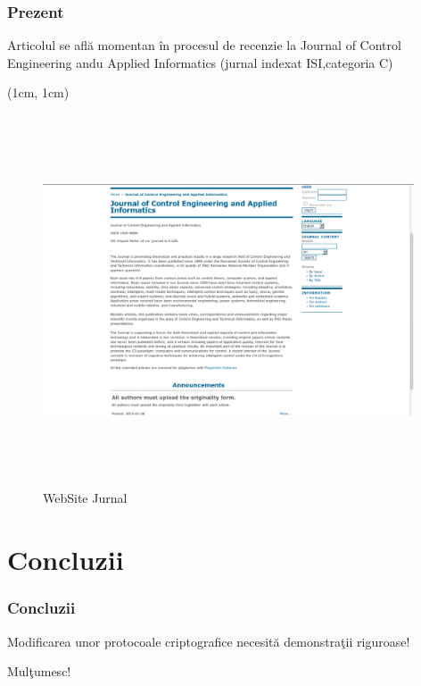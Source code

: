 \documentclass{beamer}
\theoremstyle{definition}
\begin{document}
\begin{frame}
    \frametitle{Prezent}
     {
        Articolul se afl\u{a} momentan \^{i}n procesul de recenzie la Journal of Control Engineering andu Applied Informatics (jurnal indexat ISI,categoria C)
    }
     {
        \begin{center}
         \begin{textblock*}{4cm}(1cm, 1cm)
            \begin{figure}
                \includegraphics[width=11cm,height=11cm,keepaspectratio]{img/results/ceai.png}
                \caption{WebSite Jurnal}
           \end{figure}
        \end{textblock*} 
        \end{center} 
    }
\end{frame}
\section{Concluzii}

\begin{frame}
    \frametitle{Concluzii}
    Modificarea unor protocoale criptografice necesit\u{a} demonstra\c{t}ii riguroase!
\end{frame}
\begin{frame}
\Huge{\centerline{Mul\c{t}umesc!}}
\end{frame}
\end{document}
